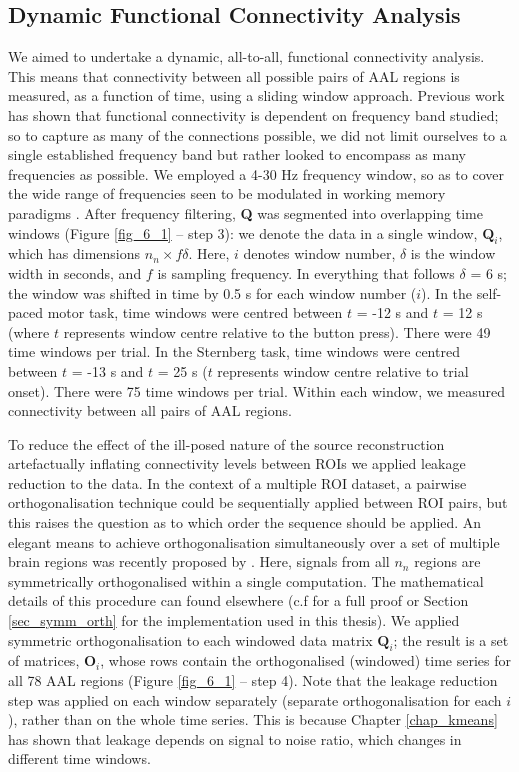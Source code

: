 \subsection{Dynamic Functional Connectivity Analysis}
We aimed to undertake a dynamic, all-to-all, functional connectivity analysis. This means that connectivity between all possible pairs of AAL regions is measured, as a function of time, using a sliding window approach. Previous work \citep{Hipp2012, Baker2014} has shown that functional connectivity is dependent on frequency band studied; so to capture as many of the connections possible, we did not limit ourselves to a single established frequency band but rather looked to encompass as many frequencies as possible. We employed a 4-30 Hz frequency window, so as to cover the wide range of frequencies seen to be modulated in working memory paradigms \citep{Brookes2012a}. After frequency filtering, \textbf{Q} was segmented into overlapping time windows (Figure \ref{fig_6_1} – step 3): we denote the data in a single window, $\mathbf{Q}_i$, which has dimensions $n_n\times f\delta$. Here, $i$ denotes window number, $\delta$ is the window width in seconds, and $f$ is sampling frequency. In everything that follows $\delta$ = 6 s; the window was shifted in time by 0.5 s for each window number ($i$). In the self-paced motor task, time windows were centred between $t$ = -12 s and $t$ = 12 s (where $t$ represents window centre relative to the button press). There were 49 time windows per trial. In the Sternberg task, time windows were centred between $t$ = -13 s and $t$ = 25 s ($t$ represents window centre relative to trial onset). There were 75 time windows per trial. Within each window, we measured connectivity between all pairs of AAL regions.

To reduce the effect of the ill-posed nature of the source reconstruction artefactually inflating connectivity levels between ROIs we applied leakage reduction to the data. In the context of a multiple ROI dataset, a pairwise orthogonalisation technique could be sequentially applied between ROI pairs, but this raises the question as to which order the sequence should be applied. An elegant means to achieve orthogonalisation simultaneously over a set of multiple brain regions was recently proposed by  \cite{Colclough2015}. Here, signals from all $n_n$ regions are symmetrically orthogonalised within a single computation. The mathematical details of this procedure can found elsewhere (c.f \citealp{Colclough2015} for a full proof or Section \ref{sec_symm_orth} for the implementation used in this thesis). We applied symmetric orthogonalisation to each windowed data matrix $\mathbf{Q}_i$; the result is a set of matrices, $\mathbf{O}_i$, whose rows contain the orthogonalised (windowed) time series for all 78 AAL regions (Figure \ref{fig_6_1} – step 4). Note that the leakage reduction step was applied on each window separately (separate orthogonalisation for each $i$), rather than on the whole time series. This is because Chapter \ref{chap_kmeans} has shown that leakage depends on signal to noise ratio, which changes in different time windows.

